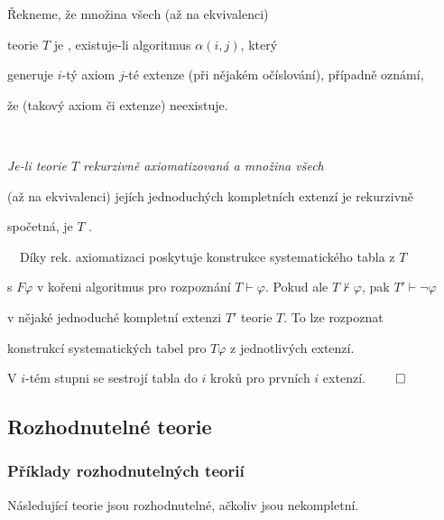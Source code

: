     \smallskip
    
    Řekneme, že množina všech (až na ekvivalenci) 
    \smallskip
    
     teorie $T$ je , existuje-li algoritmus $\alpha(i,j)$, který
    \smallskip
    
    generuje $i$-tý axiom $j$-té extenze (při nějakém očíslování), případně oznámí,
    \smallskip
    
    že (takový axiom či extenze) neexistuje.
    \medskip
    
    \smallskip
    
    {\bf {}}\ \ {\it Je-li teorie $T$ rekurzivně axiomatizovaná a množina všech
    \smallskip
    
    (až na ekvivalenci) jejích jednoduchých kompletních extenzí je rekurzivně
    \smallskip
    
    spočetná, je $T$ .}
    \medskip
    
    \smallskip
    
    {\it {}}\ \ Díky rek. axiomatizaci poskytuje konstrukce systematického tabla z $T$
    \smallskip
    
    s $F\varphi$ v kořeni algoritmus pro rozpoznání $T\vdash \varphi$. Pokud ale $T \not \vdash \varphi$, pak $T'\vdash \neg\varphi$
    \smallskip
    
    v nějaké jednoduché kompletní extenzi $T'$ teorie $T$. To lze rozpoznat 
    \smallskip
    
     konstrukcí systematických tabel pro $T\varphi$ z jednotlivých extenzí.
    \smallskip
    
    V $i$-tém stupni se sestrojí tabla do $i$ kroků pro prvních $i$ extenzí. $\qed$
    

\subsection{Rozhodnutelné teorie}\todo

\subsubsection*{Příklady rozhodnutelných teorií}
Následující teorie jsou rozhodnutelné, ačkoliv jsou nekompletní.
\smallskip

